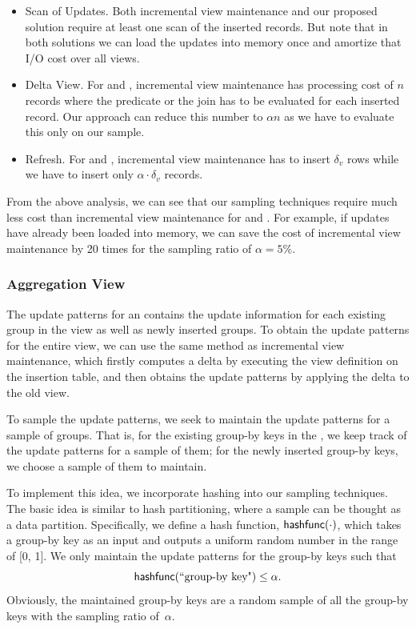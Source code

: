 \begin{itemize} %
\item Scan of Updates. Both incremental view maintenance and our proposed solution require at least one scan of the inserted records. But note that in both solutions we can load the updates into memory once and amortize that I/O cost over all views.  \vspace{-0.5em}
\item Delta View. For \spview and \fjview, incremental view maintenance has processing cost of $n$ records where the predicate or the join has to be evaluated for each inserted record. Our approach can reduce this number to $\alpha n$ as we have to evaluate this only on our sample. \vspace{-0.5em}
\item Refresh. For \spview and \fjview, incremental view maintenance has to insert $\delta_v$ rows while we have to insert only $\alpha \cdot \delta_v$ records.  
\end{itemize}

From the above analysis, we can see that our sampling techniques require much less cost than incremental view maintenance for \spview and \fjview. For example, if updates have already been loaded into memory, we can save the cost of incremental view maintenance by 20 times for the sampling ratio of $\alpha = 5 \%$.

\subsubsection{Aggregation View}
The update patterns for an \aggview contains the update information for each existing group in the view as well as newly inserted groups. To obtain the update patterns for the entire view, we can use the same method as incremental view maintenance, which firstly computes a delta \aggview by executing the view definition on the insertion table, and then obtains the update patterns by applying the delta \aggview to the old view. 

To sample the update patterns, we seek to maintain the update patterns for a sample of groups. That is, for the existing group-by keys in the \aggview, we keep track of the update patterns for a sample of them; for the newly inserted group-by keys, we choose a sample of them to maintain. 

To implement this idea, we incorporate hashing into our sampling techniques. The basic idea is similar to hash partitioning, where a sample can be thought as a data partition. Specifically, we define a hash function, $\textsf{hashfunc}(\cdot)$, which takes a group-by key as an input and outputs a uniform random number in the range of [0, 1]. We only maintain the update patterns for the group-by keys such that
\begin{equation}\label{eq:hash}
\textsf{hashfunc}(\textrm{``group-by key"}) \leq \alpha.
\end{equation}
Obviously, the maintained group-by keys are a random sample of all the group-by keys with the sampling ratio of~$\alpha$.

